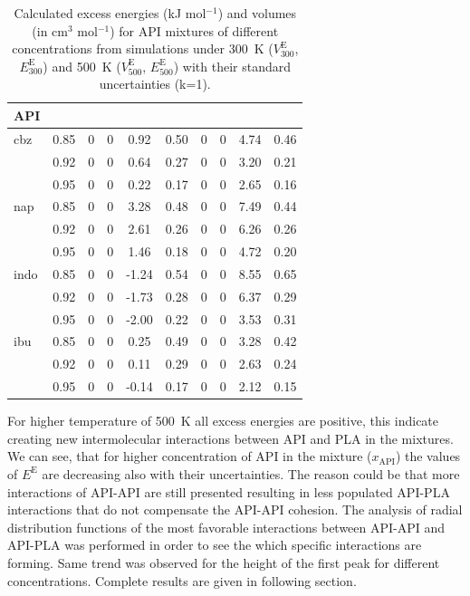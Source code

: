 \begin{table}[htb]
	\caption{Calculated excess energies (kJ mol$^{-1}$) and volumes (in cm$^3$ mol$^{-1}$) for API mixtures of different concentrations from simulations under 300~K ($V_{300}^\text{E}$, $E_{300}^\text{E}$) and 500~K ($V_{500}^\text{E}$, $E_{500}^\text{E}$) with their standard uncertainties (k=1).}
	\centering
	\begin{tabular}{lSSSSSSSSS}
	\toprule
	\textbf{API} &  &  &  &  &  &  &  &  &  \\
	\midrule
		cbz & 0.85 & 0 & 0 & 0.92 & 0.50 & 0 & 0 & 4.74 & 0.46 \\
		& 0.92 & 0 & 0 & 0.64 & 0.27 & 0 & 0 & 3.20 & 0.21 \\
		& 0.95 & 0 & 0 & 0.22 & 0.17 & 0 & 0 & 2.65 & 0.16 \\
		\midrule
		nap & 0.85 & 0 & 0 & 3.28 & 0.48 & 0 & 0 & 7.49 & 0.44 \\
		& 0.92 & 0 & 0 & 2.61 & 0.26 & 0 & 0 & 6.26 & 0.26 \\
		& 0.95 & 0 & 0 & 1.46 & 0.18 & 0 & 0 & 4.72 & 0.20 \\
		\midrule
		indo & 0.85 & 0 & 0 & -1.24 & 0.54 & 0 & 0 & 8.55 & 0.65 \\
		& 0.92 & 0 & 0 & -1.73 & 0.28 & 0 & 0 & 6.37 & 0.29 \\
		& 0.95 & 0 & 0 & -2.00 & 0.22 & 0 & 0 & 3.53 & 0.31 \\
		\midrule
		ibu & 0.85 & 0 & 0 & 0.25 & 0.49 & 0 & 0 & 3.28 & 0.42 \\
		& 0.92 & 0 & 0 & 0.11 & 0.29 & 0 & 0 & 2.63 & 0.24 \\
		& 0.95 & 0 & 0 & -0.14 & 0.17 & 0 & 0 & 2.12 & 0.15 \\
	\bottomrule
	\end{tabular}
	\label{tab:vobjemy} 
\end{table}

For higher temperature of 500~K all excess energies are positive, this indicate creating new intermolecular interactions between API and PLA in the mixtures. We can see, that for higher concentration of API in the mixture ($x_{\text{API}}$) the values of $E^\text{E}$ are decreasing also with their uncertainties. The reason could be that more interactions of API-API are still presented resulting in less populated API-PLA interactions that do not compensate the API-API cohesion. The analysis of radial distribution functions of the most favorable interactions between API-API and API-PLA was performed in order to see the which specific interactions are forming. Same trend was observed for the height of the first peak for different concentrations. Complete results are given in following section.

